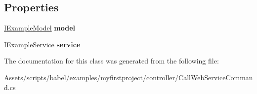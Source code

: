 \subsection*{Properties}
\begin{DoxyCompactItemize}
\item 
\hypertarget{classbabel_1_1examples_1_1myfirstproject_1_1_call_web_service_command_a3af55505d6aad9dde6e143797ecd94f2}{\hyperlink{interfacebabel_1_1examples_1_1myfirstproject_1_1_i_example_model}{I\-Example\-Model} {\bfseries model}}\label{classbabel_1_1examples_1_1myfirstproject_1_1_call_web_service_command_a3af55505d6aad9dde6e143797ecd94f2}

\item 
\hypertarget{classbabel_1_1examples_1_1myfirstproject_1_1_call_web_service_command_adedd153cc219345dcad60cd6109f447d}{\hyperlink{interfacebabel_1_1examples_1_1myfirstproject_1_1_i_example_service}{I\-Example\-Service} {\bfseries service}}\label{classbabel_1_1examples_1_1myfirstproject_1_1_call_web_service_command_adedd153cc219345dcad60cd6109f447d}

\end{DoxyCompactItemize}


The documentation for this class was generated from the following file\-:\begin{DoxyCompactItemize}
\item 
Assets/scripts/babel/examples/myfirstproject/controller/Call\-Web\-Service\-Command.\-cs\end{DoxyCompactItemize}
